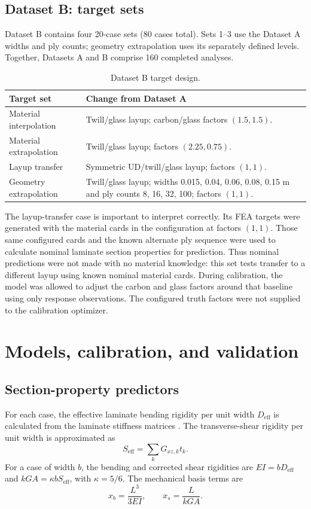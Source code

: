 \documentclass[11pt]{article}
\newcommand{\Dref}{D_{\mathrm{eff}}}
\newcommand{\Sref}{S_{\mathrm{eff}}}
\begin{document}
\subsection{Dataset B: target sets}
Dataset B contains four 20-case sets (80 cases total). Sets 1--3 use the Dataset A widths and ply counts; geometry extrapolation uses its separately defined levels. Together, Datasets A and B comprise 160 completed analyses.
\begin{table}[ht]
\centering
\small
\caption{Dataset B target design.}
\begin{tabularx}{\linewidth}{l X}
\toprule
Target set & Change from Dataset A \\
\midrule
Material interpolation & Twill/glass layup; carbon/glass factors $(1.5,1.5)$. \\
Material extrapolation & Twill/glass layup; factors $(2.25,0.75)$. \\
Layup transfer & Symmetric UD/twill/glass layup; factors $(1,1)$. \\
Geometry extrapolation & Twill/glass layup; widths 0.015, 0.04, 0.06, 0.08, 0.15 m and ply counts 8, 16, 32, 100; factors $(1,1)$. \\
\bottomrule
\end{tabularx}
\end{table}

The layup-transfer case is important to interpret correctly. Its FEA targets were generated with the material cards in the configuration at factors $(1,1)$. Those same configured cards and the known alternate ply sequence were used to calculate nominal laminate section properties for prediction. Thus nominal predictions were not made with no material knowledge: this set tests transfer to a different layup using known nominal material cards. During calibration, the model was allowed to adjust the carbon and glass factors around that baseline using only response observations. The configured truth factors were not supplied to the calibration optimizer.

\section{Models, calibration, and validation}
\subsection{Section-property predictors}
For each case, the effective laminate bending rigidity per unit width $\Dref$ is calculated from the laminate stiffness matrices \cite{reddy}. The transverse-shear rigidity per unit width is approximated as
\begin{equation}
 \Sref=\sum_k G_{xz,k}t_k.
\end{equation}
For a case of width $b$, the bending and corrected shear rigidities are $EI=b\Dref$ and $kGA=\kappa b\Sref$, with $\kappa=5/6$. The mechanical basis terms are
\begin{equation}
 x_b=\frac{L^3}{3EI}, \qquad x_s=\frac{L}{kGA}.
\end{equation}
\end{document}

